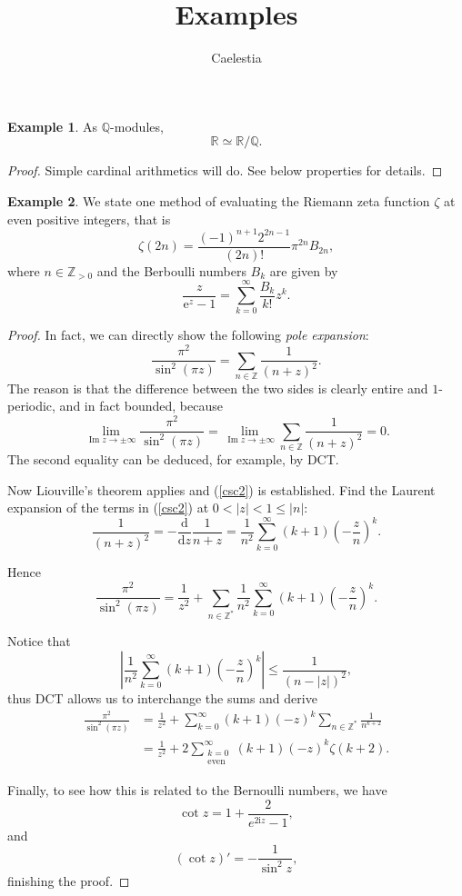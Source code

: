 \documentclass[17pt]{extarticle}
\title{Examples}
\author{Caelestia }
\theoremstyle{definition}\newtheorem{example}{Example}[]
\theoremstyle{definition}\newtheorem{corollary}[example]{Corollary}
\theoremstyle{definition}\newtheorem{definition}[example]{Definition}
\theoremstyle{definition}\newtheorem{lemma}[example]{Lemma}
\theoremstyle{definition}\newtheorem{theorem}[example]{Theorem}
\theoremstyle{definition}\newtheorem{proposition}[example]{Proposition}
\theoremstyle{definition}\newtheorem{remark}[example]{Remark}
\begin{document}
\maketitle\newpage

\begin{example}
    As $\mathbb{Q}$-modules,
    $$\mathbb{R}\simeq\mathbb{R}/\mathbb{Q}.$$

\end{example}

\begin{proof}
    Simple cardinal arithmetics will do. See below properties for details.
\end{proof}

\begin{example}
    We state one method of evaluating the Riemann zeta function $\zeta$ at even positive integers, that is
    $$\zeta(2n)=\frac{(-1)^{n+1}2^{2n-1}}{(2n)!}\pi^{2n}B_{2n},$$
    where $n\in\mathbb{Z}_{>0}$ and the Berboulli numbers $B_k$ are given by
    $$\frac{z}{\mathrm{e}^z-1}=\sum_{k=0}^\infty\frac{B_k}{k!}z^k.$$
\end{example}

\begin{proof}
    In fact, we can directly show the following \emph{pole expansion}:
    \begin{equation}\label{csc2}
        \frac{\pi^2}{\sin^2(\pi z)}=\sum_{n\in\mathbb{Z}}\frac{1}{(n+z)^2}.
    \end{equation}
    The reason is that the difference between the two sides is clearly entire and $1$-periodic, and in fact bounded, because
    $$\lim_{\operatorname{Im}z\to\pm\infty}\frac{\pi^2}{\sin^2(\pi z)}=\lim_{\operatorname{Im}z\to\pm\infty}\sum_{n\in\mathbb{Z}}\frac{1}{(n+z)^2}=0.$$
    The second equality can be deduced, for example, by DCT.
    
    Now Liouville's theorem applies and (\ref{csc2}) is established. Find the Laurent expansion of the terms in (\ref{csc2}) at $0<|z|<1\leq|n|$:
    $$\frac{1}{(n+z)^2}=-\frac{\mathrm{d}}{\mathrm{d}z}\frac{1}{n+z}=\frac{1}{n^2}\sum_{k=0}^\infty(k+1)\left(-\frac{z}{n}\right)^k.$$
    
    Hence
    $$\frac{\pi^2}{\sin^2(\pi z)}=\frac{1}{z^2}+\sum_{n\in\mathbb{Z}^*}\frac{1}{n^2}\sum_{k=0}^\infty(k+1)\left(-\frac{z}{n}\right)^k.$$
    
    Notice that
    $$\left|\frac{1}{n^2}\sum_{k=0}^\infty(k+1)\left(-\frac{z}{n}\right)^k\right|\leq\frac{1}{(n-|z|)^2},$$
    thus DCT allows us to interchange the sums and derive
    \begin{align*}
        \frac{\pi^2}{\sin^2(\pi z)} &=\frac{1}{z^2}+\sum_{k=0}^\infty(k+1)(-z)^k\sum_{n\in\mathbb{Z}^*}\frac{1}{n^{k+2}} \\
        &=\frac{1}{z^2}+2\sum_{\substack{k=0\\ \text{even}}}^\infty(k+1)(-z)^k\zeta(k+2).
    \end{align*}

    Finally, to see how this is related to the Bernoulli numbers, we have
    $$\cot z=1+\frac{2}{e^{2\mathrm{i}z}-1},$$
    and
    $$(\cot z)'=-\frac{1}{\sin^2z},$$
    finishing the proof.
\end{proof}
\end{document}
